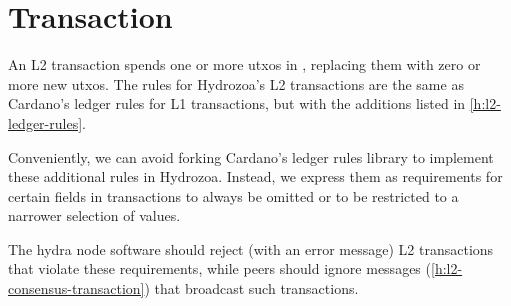 \documentclass[../hydrozoa.tex]{subfiles}
\begin{document}
\section{Transaction}%
\label{h:ledger-transaction}%

An L2 transaction spends one or more utxos in , replacing them with zero or more new utxos.
The rules for Hydrozoa's L2 transactions are the same as Cardano's ledger rules for L1 transactions, but with the additions listed in \cref{h:l2-ledger-rules}.

Conveniently, we can avoid forking Cardano's ledger rules library to implement these additional rules in Hydrozoa.
Instead, we express them as requirements for certain fields in transactions to always be omitted or to be restricted to a narrower selection of values.

The hydra node software should reject (with an error message) L2 transactions that violate these requirements, while peers should ignore  messages (\cref{h:l2-consensus-transaction}) that broadcast such transactions.
\end{document}
